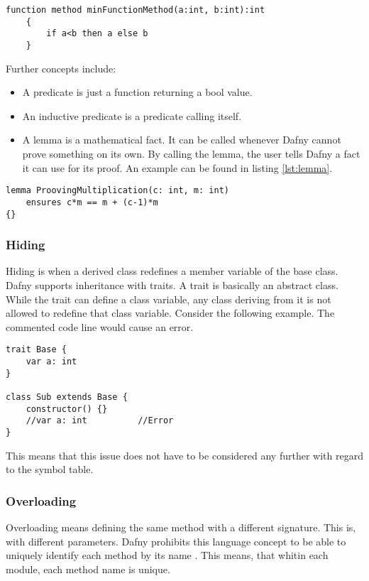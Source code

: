 \begin{lstlisting}[caption={Function}, captionpos=b, label={lst:function}]
    function method minFunctionMethod(a:int, b:int):int
    {
        if a<b then a else b
    }
\end{lstlisting}

Further concepts include:
\begin{itemize}
\item A predicate is just a function returning a bool value.
\item An inductive predicate is a predicate calling itself.
\item A lemma is a mathematical fact. It can be called whenever Dafny cannot prove something on its own. By calling the lemma, the user tells Dafny a fact it can use for its proof. An example can be found in listing \ref{lst:lemma}. \cite{dafnyReferenceManual}
\end{itemize}

\begin{lstlisting}[caption={Lemma}, captionpos=b, label={lst:lemma}]
lemma ProovingMultiplication(c: int, m: int)
    ensures c*m == m + (c-1)*m
{}
\end{lstlisting}

\subsubsection{Hiding}
Hiding is when a derived class redefines a member variable of the base class. Dafny supports inheritance with traits. A trait is basically an abstract class. While the trait can define a class variable, any class deriving from it is not allowed to redefine that class variable. Consider the following example. The commented code line would cause an error. \cite{dafnyReferenceManual}

\begin{lstlisting}[caption={Hiding}, captionpos=b, label={lst:hiding}]
trait Base {
    var a: int
}

class Sub extends Base {
    constructor() {}
    //var a: int          //Error
}
\end{lstlisting}

This means that this issue does not have to be considered any further with regard to the symbol table.

\subsubsection{Overloading}
Overloading means defining the same method with a different signature. This is, with different parameters. Dafny prohibits this language concept to be able to uniquely identify each method by its name \cite{dafnyReferenceManual}.
This means, that whitin each module, each method name is unique.

